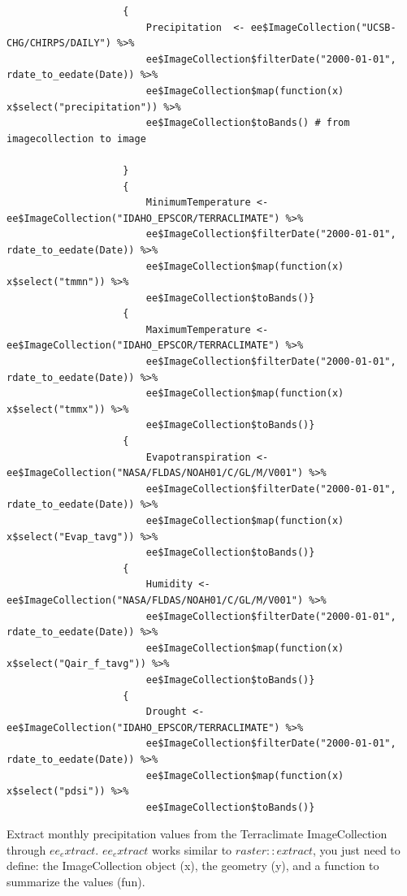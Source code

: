 \documentclass[12pt,a4paper]{book}
\begin{document}
				\begin{verbatim}
					{
						Precipitation  <- ee$ImageCollection("UCSB-CHG/CHIRPS/DAILY") %>%
						ee$ImageCollection$filterDate("2000-01-01", rdate_to_eedate(Date)) %>%
						ee$ImageCollection$map(function(x) x$select("precipitation")) %>% 
						ee$ImageCollection$toBands() # from imagecollection to image
						
					}
					{
						MinimumTemperature <- ee$ImageCollection("IDAHO_EPSCOR/TERRACLIMATE") %>%
						ee$ImageCollection$filterDate("2000-01-01", rdate_to_eedate(Date)) %>%
						ee$ImageCollection$map(function(x) x$select("tmmn")) %>% 
						ee$ImageCollection$toBands()}
					{
						MaximumTemperature <- ee$ImageCollection("IDAHO_EPSCOR/TERRACLIMATE") %>%
						ee$ImageCollection$filterDate("2000-01-01", rdate_to_eedate(Date)) %>%
						ee$ImageCollection$map(function(x) x$select("tmmx")) %>% 
						ee$ImageCollection$toBands()}
					{
						Evapotranspiration <- ee$ImageCollection("NASA/FLDAS/NOAH01/C/GL/M/V001") %>%
						ee$ImageCollection$filterDate("2000-01-01", rdate_to_eedate(Date)) %>%
						ee$ImageCollection$map(function(x) x$select("Evap_tavg")) %>% 
						ee$ImageCollection$toBands()}
					{
						Humidity <- ee$ImageCollection("NASA/FLDAS/NOAH01/C/GL/M/V001") %>%
						ee$ImageCollection$filterDate("2000-01-01", rdate_to_eedate(Date)) %>%
						ee$ImageCollection$map(function(x) x$select("Qair_f_tavg")) %>% 
						ee$ImageCollection$toBands()}
					{
						Drought <- ee$ImageCollection("IDAHO_EPSCOR/TERRACLIMATE") %>%
						ee$ImageCollection$filterDate("2000-01-01", rdate_to_eedate(Date)) %>%
						ee$ImageCollection$map(function(x) x$select("pdsi")) %>% 
						ee$ImageCollection$toBands()}
				\end{verbatim}
			Extract monthly precipitation values from the Terraclimate ImageCollection
			 through $ ee_extract $. $ ee_extract $ works similar to $ raster::extract $, 
			 you just need to define: the ImageCollection object (x), the geometry (y),
			 and a function to summarize the values (fun).	  
\end{document}
